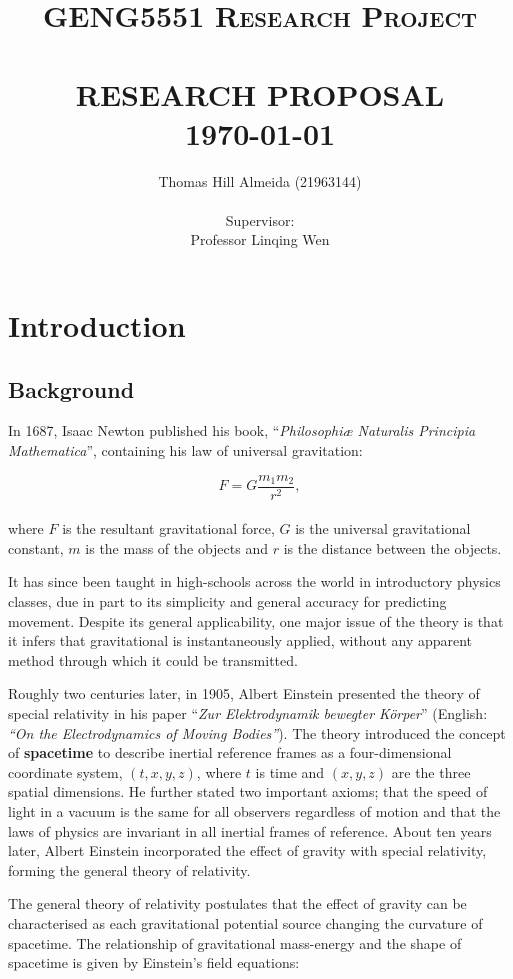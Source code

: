 \documentclass{article}
\title{\normalsize \textsc{GENG5551 Research Project}
        \\ [1.5cm]
        \HRule{0.5pt} \\
        \LARGE \textbf{\uppercase{Research Proposal}}
        \HRule{2pt} \\ [0.5cm]
        \normalsize \today \vspace*{3\baselineskip}}
\author{Thomas Hill Almeida (21963144)\\
\\
Supervisor:\\
Professor Linqing Wen
}
\date{}
\begin{document}
\maketitle{}
\tableofcontents{}
\newpage{}

\section{Introduction}
\subsection{Background}

In 1687, Isaac Newton published his book, ``\textit{Philosophi\ae{} Naturalis Principia
Mathematica}'', containing his law of universal gravitation:

\begin{equation}
    F = G\dfrac{m_1m_2}{r^2},
\end{equation}
\\
where \(F\) is the resultant gravitational force, \(G\) is the universal gravitational constant,
\(m\) is the mass of the objects and \(r\) is the distance between the objects.

It has since been taught in high-schools across the world in introductory physics classes, due in
part to its simplicity and general accuracy for predicting movement. Despite its general
applicability, one major issue of the theory is that it infers that gravitational is instantaneously
applied, without any apparent method through which it could be transmitted.

Roughly two centuries later, in 1905, Albert Einstein presented the theory of special relativity
in his paper ``\textit{Zur Elektrodynamik bewegter K{\"o}rper}'' (English: \textit{``On the
Electrodynamics of Moving Bodies''}). The theory introduced the concept of \textbf{spacetime} to
describe inertial reference frames as a four-dimensional coordinate system, \((t, x, y, z)\), where
$t$ is time and \((x, y, z)\) are the three spatial dimensions. He further stated two important
axioms; that the speed of light in a vacuum is the same for all observers regardless of motion and
that the laws of physics are invariant in all inertial frames of reference. About ten years later,
Albert Einstein incorporated the effect of gravity with special relativity, forming the general
theory of relativity.

The general theory of relativity postulates that the effect of gravity can be characterised as each
gravitational potential source changing the curvature of spacetime. The relationship of
gravitational mass-energy and the shape of spacetime is given by Einstein's field equations:
\end{document}
